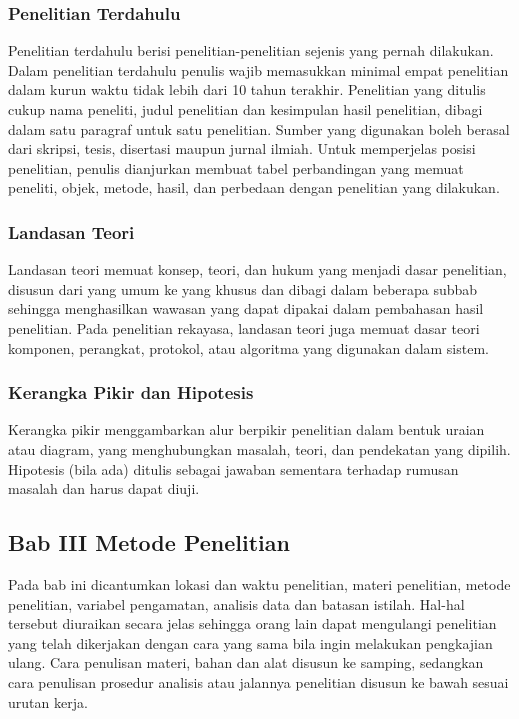 \subsubsection{Penelitian Terdahulu}
Penelitian terdahulu berisi penelitian-penelitian sejenis yang pernah dilakukan. Dalam penelitian terdahulu penulis wajib memasukkan minimal empat penelitian dalam kurun waktu tidak lebih dari 10 tahun terakhir. Penelitian yang ditulis cukup nama peneliti, judul penelitian dan kesimpulan hasil penelitian, dibagi dalam satu paragraf untuk satu penelitian. Sumber yang digunakan boleh berasal dari skripsi, tesis, disertasi maupun jurnal ilmiah. Untuk memperjelas posisi penelitian, penulis dianjurkan membuat tabel perbandingan yang memuat peneliti, objek, metode, hasil, dan perbedaan dengan penelitian yang dilakukan.

\subsubsection{Landasan Teori}
Landasan teori memuat konsep, teori, dan hukum yang menjadi dasar penelitian, disusun dari yang umum ke yang khusus dan dibagi dalam beberapa subbab sehingga menghasilkan wawasan yang dapat dipakai dalam pembahasan hasil penelitian. Pada penelitian rekayasa, landasan teori juga memuat dasar teori komponen, perangkat, protokol, atau algoritma yang digunakan dalam sistem.

\subsubsection{Kerangka Pikir dan Hipotesis}
Kerangka pikir menggambarkan alur berpikir penelitian dalam bentuk uraian atau diagram, yang menghubungkan masalah, teori, dan pendekatan yang dipilih. Hipotesis (bila ada) ditulis sebagai jawaban sementara terhadap rumusan masalah dan harus dapat diuji.

\subsection{Bab III Metode Penelitian}
Pada bab ini dicantumkan lokasi dan waktu penelitian, materi penelitian, metode penelitian, variabel pengamatan, analisis data dan batasan istilah. Hal-hal tersebut diuraikan secara jelas sehingga orang lain dapat mengulangi penelitian yang telah dikerjakan dengan cara yang sama bila ingin melakukan pengkajian ulang. Cara penulisan materi, bahan dan alat disusun ke samping, sedangkan cara penulisan prosedur analisis atau jalannya penelitian disusun ke bawah sesuai urutan kerja.

